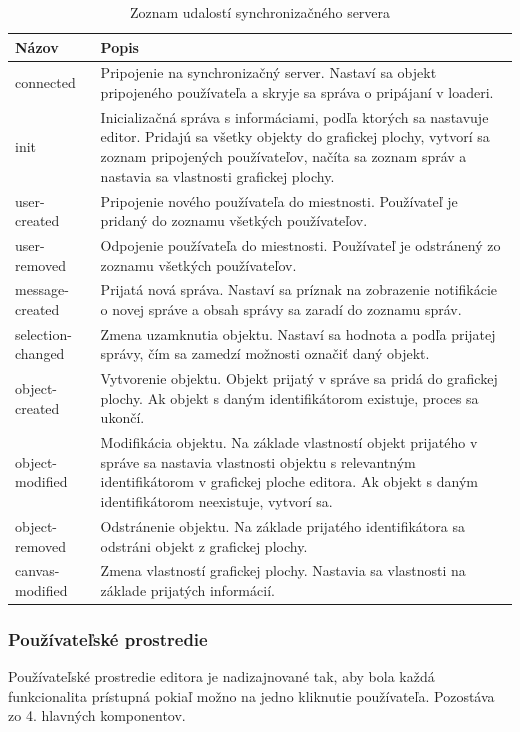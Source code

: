 \begin{table}
	\begin{tabular}{ | m{4cm} | m{8.5cm} | } \hline
		\textbf{Názov} & \textbf{Popis} \\ \hline \hline
		
		connected & Pripojenie na synchronizačný server. Nastaví sa objekt pripojeného používateľa a skryje sa správa o pripájaní v loaderi. \\\hline
		init & Inicializačná správa s informáciami, podľa ktorých sa nastavuje editor. Pridajú sa všetky objekty do grafickej plochy, vytvorí sa zoznam pripojených používateľov, načíta sa zoznam správ a nastavia sa vlastnosti grafickej plochy. \\\hline
		user-created & Pripojenie nového používateľa do miestnosti. Používateľ je pridaný do zoznamu všetkých používateľov. \\\hline
		user-removed & Odpojenie používateľa do miestnosti. Používateľ je odstránený zo zoznamu všetkých používateľov. \\\hline
		message-created & Prijatá nová správa. Nastaví sa príznak na zobrazenie notifikácie o novej správe a obsah správy sa zaradí do zoznamu správ. \\\hline
		selection-changed & Zmena uzamknutia objektu. Nastaví sa hodnota \code{selectable} a \code{selectedBy} podľa prijatej správy, čím sa zamedzí možnosti označiť daný objekt. \\\hline
		object-created & Vytvorenie objektu. Objekt prijatý v správe sa pridá do grafickej plochy. Ak objekt s daným identifikátorom existuje, proces sa ukončí. \\\hline
		object-modified & Modifikácia objektu. Na základe vlastností objekt prijatého v správe sa nastavia vlastnosti objektu s relevantným identifikátorom v grafickej ploche editora. Ak objekt s daným identifikátorom neexistuje, vytvorí sa. \\\hline
		object-removed & Odstránenie objektu. Na základe prijatého identifikátora sa odstráni objekt z grafickej plochy. \\\hline
 		canvas-modified & Zmena vlastností grafickej plochy. Nastavia sa vlastnosti na základe prijatých informácií. \\\hline
		   
		\hline
	\end{tabular}
	\caption{Zoznam udalostí synchronizačného servera}
\label{tab:server-events}
\end{table}
\FloatBarrier
\subsubsection{Používateľské prostredie}
Používateľské prostredie editora je nadizajnované tak, aby bola každá funkcionalita prístupná pokiaľ možno na jedno kliknutie používateľa. Pozostáva zo 4. hlavných komponentov.

